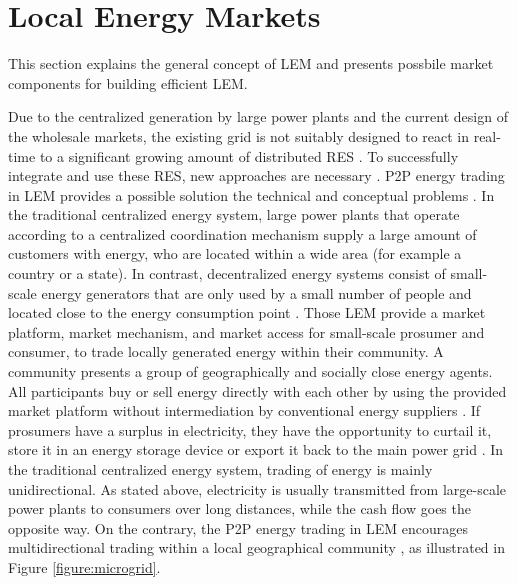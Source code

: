 \section{Local Energy Markets}
\label{sec:lem}
This section explains the general concept of LEM
and presents possbile market components for building efficient LEM.

Due to the centralized generation by large power plants
and the current design of the wholesale markets, the existing grid is not suitably designed
to react in real-time to a significant growing 
amount of distributed RES .
To successfully integrate and use these RES, new approaches are necessary .
P2P energy trading in LEM provides a possible solution the technical and conceptual problems .
In the traditional centralized energy system, large power plants that operate according to a
centralized coordination mechanism supply a large amount of customers with energy, who are located 
within a wide area (for example a country or a state).
In contrast, decentralized energy systems consist of small-scale energy generators that are 
only used by a small number of people and located close to the energy consumption point .
Those LEM provide a market platform, market mechanism, and market access
for small-scale prosumer and consumer, to trade locally generated energy within their community.
A community presents a group of geographically and socially close energy agents.
All participants buy or sell energy directly with each other by using the provided market platform
without intermediation by conventional energy suppliers .
If prosumers have a surplus in electricity, they have the opportunity 
to curtail it, store it in an energy storage device or export it back to the main power grid .
In the traditional centralized energy system, trading of energy is mainly unidirectional.
As stated above, electricity is usually transmitted from large-scale power plants to 
consumers over long distances, while the cash flow goes the opposite way. 
On the contrary, the P2P energy trading in LEM encourages multidirectional trading within 
a local geographical community , as illustrated in Figure \ref{figure:microgrid}.

